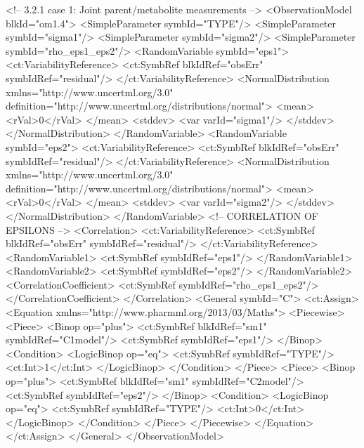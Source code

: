 \documentclass[a4paper,10pt]{article}
\begin{document}
\begin{xmlcode}
<!-- 3.2.1	case 1: Joint parent/metabolite measurements -->
<ObservationModel blkId="om1.4">
    <SimpleParameter symbId="TYPE"/>
    <SimpleParameter symbId="sigma1"/>
    <SimpleParameter symbId="sigma2"/>
    <SimpleParameter symbId="rho_eps1_eps2"/>
    <RandomVariable symbId="eps1">
        <ct:VariabilityReference>
            <ct:SymbRef blkIdRef="obsErr" symbIdRef="residual"/>
        </ct:VariabilityReference>
        <NormalDistribution xmlns="http://www.uncertml.org/3.0" definition="http://www.uncertml.org/distributions/normal">
            <mean>
                <rVal>0</rVal>
            </mean>
            <stddev>
                <var varId="sigma1"/> 
            </stddev>
        </NormalDistribution>
    </RandomVariable>
    <RandomVariable symbId="eps2">
        <ct:VariabilityReference>
            <ct:SymbRef blkIdRef="obsErr" symbIdRef="residual"/>
        </ct:VariabilityReference>
        <NormalDistribution xmlns="http://www.uncertml.org/3.0" definition="http://www.uncertml.org/distributions/normal">
            <mean>
                <rVal>0</rVal>
            </mean>
            <stddev>
                <var varId="sigma2"/> 
            </stddev>
        </NormalDistribution>
    </RandomVariable>
    <!-- CORRELATION OF EPSILONS -->
    <Correlation>
        <ct:VariabilityReference>
            <ct:SymbRef blkIdRef="obsErr" symbIdRef="residual"/>
        </ct:VariabilityReference>
        <RandomVariable1>
            <ct:SymbRef symbIdRef="eps1"/>
        </RandomVariable1>
        <RandomVariable2>
            <ct:SymbRef symbIdRef="eps2"/>
        </RandomVariable2>
        <CorrelationCoefficient>
            <ct:SymbRef symbIdRef="rho_eps1_eps2"/>
        </CorrelationCoefficient>
    </Correlation>
    <General symbId="C">
        <ct:Assign>
            <Equation xmlns="http://www.pharmml.org/2013/03/Maths">
                <Piecewise>
                    <Piece>
                        <Binop op="plus">
                            <ct:SymbRef blkIdRef="sm1" symbIdRef="C1model"/>
                            <ct:SymbRef symbIdRef="eps1"/>
                        </Binop>
                        <Condition>
                            <LogicBinop op="eq">
                                <ct:SymbRef symbIdRef="TYPE"/>
                                <ct:Int>1</ct:Int>
                            </LogicBinop>
                        </Condition>
                    </Piece>
                    <Piece>
                        <Binop op="plus">
                            <ct:SymbRef blkIdRef="sm1" symbIdRef="C2model"/>
                            <ct:SymbRef symbIdRef="eps2"/>
                        </Binop>
                        <Condition>
                            <LogicBinop op="eq">
                                <ct:SymbRef symbIdRef="TYPE"/>
                                <ct:Int>0</ct:Int>
                            </LogicBinop>
                        </Condition>
                    </Piece>
                </Piecewise>
            </Equation>
        </ct:Assign>
    </General>
</ObservationModel>
\end{xmlcode}
\end{document}
